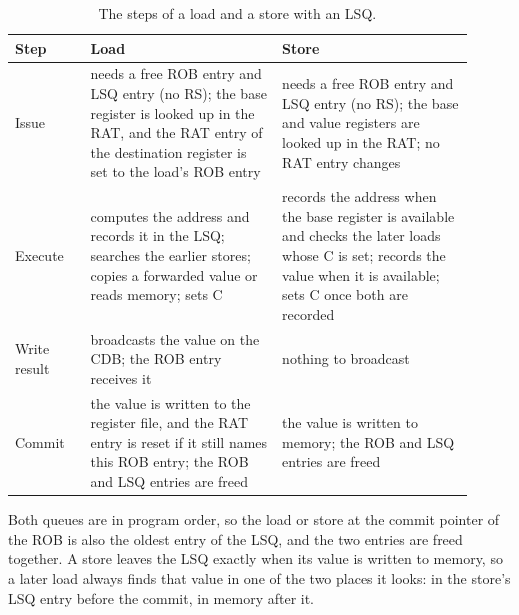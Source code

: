 \documentclass[../main.tex]{subfiles}
\begin{document}
\begin{table}[htbp]
  \centering\small
  \caption{The steps of a load and a store with an LSQ.}
  \label{tab:l09-steps}
  \begin{tabular}{@{}>{\raggedright\arraybackslash}p{0.15\linewidth}>{\raggedright\arraybackslash}p{0.38\linewidth}>{\raggedright\arraybackslash}p{0.38\linewidth}@{}}
    \toprule
    Step & Load & Store \\
    \midrule
    Issue & needs a free ROB entry and LSQ entry (no RS); the base register is
      looked up in the RAT, and the RAT entry of the destination register is
      set to the load's ROB entry & needs a free ROB entry and LSQ entry (no
      RS); the base and value registers are looked up in the RAT; no RAT entry
      changes \\
    \addlinespace
    Execute & computes the address and records it in the LSQ; searches the
      earlier stores; copies a forwarded value or reads memory; sets C
      & records the address when the base register is available and checks
      the later loads whose C is set; records the value when it is available;
      sets C once both are recorded \\
    \addlinespace
    Write result & broadcasts the value on the CDB; the ROB entry receives it
      & nothing to broadcast \\
    \addlinespace
    Commit & the value is written to the register file, and the RAT entry is
      reset if it still names this ROB entry; the ROB and LSQ entries are
      freed & the value is written to memory; the ROB and LSQ entries are
      freed \\
    \bottomrule
  \end{tabular}
\end{table}

Both queues are in program order, so the load or store at the commit pointer of
the ROB is also the oldest entry of the LSQ, and the two entries are freed
together.  A store leaves the LSQ exactly when its value is
written to memory, so a later load always finds that value in one of the two
places it looks: in the store's LSQ entry before the commit, in memory after
it.
\end{document}
